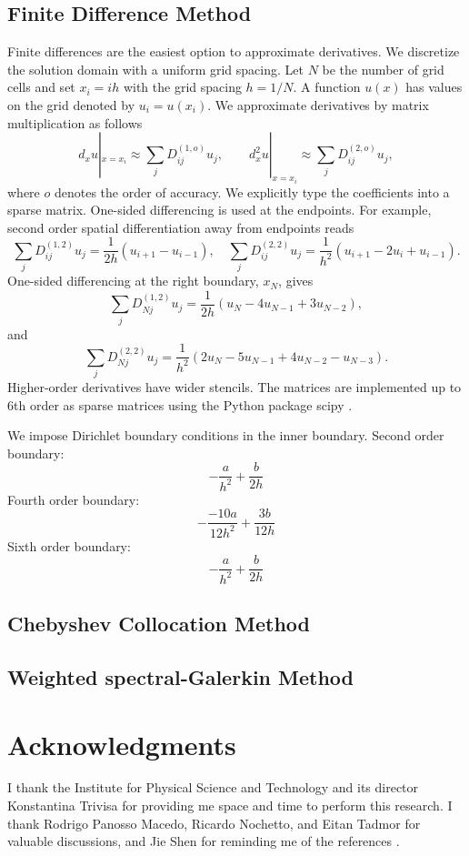 \documentclass[final,onefignum,onetabnum]{siamart190516}
\begin{document}
\subsection{Finite Difference Method}
Finite differences are the easiest option to approximate derivatives. We discretize the solution domain with a uniform grid spacing. Let $N$ be the number of grid cells and set $x_i=i h$ with the grid spacing $h=1/N$. A function $u(x)$ has values on the grid denoted by $u_i=u(x_i)$. We approximate derivatives by matrix multiplication as follows
\[ d_x u|_{x=x_i} \approx \sum_j {D_{ij}^{(1,o)}} u_j, \qquad d_x^2 u|_{x=x_i} \approx \sum_j D_{ij}^{(2,o)} u_j, \]
where $o$ denotes the order of accuracy. We explicitly type the coefficients into a sparse matrix. One-sided differencing is used at the endpoints. For example, second order spatial differentiation away from endpoints reads 
\[ \sum_j {D_{ij}^{(1,2)}} u_j  = \frac{1}{2h} (u_{i+1}- u_{i-1}), \quad \sum_j {D_{ij}^{(2,2)}} u_j = \frac{1}{h^2} (u_{i+1}- 2 u_i + u_{i-1}). \]
One-sided differencing at the right boundary, $x_N$, gives
\[ \sum_j {D_{Nj}^{(1,2)}} u_j = \frac{1}{2h}(u_N - 4 u_{N-1} + 3 u_{N-2}),\]
and
\[ \sum_j {D_{Nj}^{(2,2)}} u_j = \frac{1}{h^2}(2 u_N - 5 u_{N-1} + 4 u_{N-2} - u_{N-3}).\]
Higher-order derivatives have wider stencils. The matrices are implemented up to 6th order as sparse matrices using the Python package scipy \cite{2020SciPy-NMeth}.

We impose Dirichlet boundary conditions in the inner boundary. 
Second order boundary:
\[ -\frac{a}{h^2} + \frac{b}{2h} \]
Fourth order boundary:
\[ -\frac{-10a}{12 h^2} + \frac{3 b}{12h} \]
Sixth order boundary:
\[ -\frac{a}{h^2} + \frac{b}{2h} \]

\subsection{Chebyshev Collocation Method}


\subsection{Weighted spectral-Galerkin Method}


\section*{Acknowledgments}
I thank the Institute for Physical Science and Technology and its director Konstantina Trivisa for providing me space and time to perform this research. I thank Rodrigo Panosso Macedo, Ricardo Nochetto, and Eitan Tadmor for valuable discussions, and Jie Shen for reminding me of the references \cite{wang2017perfect, yang2021truly}. 



%


\end{document}
